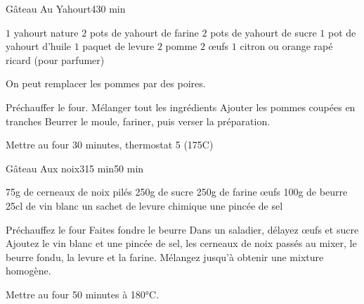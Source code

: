 \begin{recette}{Gâteau Au Yahourt}{4}{}{30 min}

\begin{ingredients}
\ingredient $1$ yahourt nature
\ingredient $2$ pots de yahourt de farine
\ingredient $2$ pots de yahourt de sucre
\ingredient $1$ pot de yahourt d'huile
\ingredient $1$ paquet de levure
\ingredient $2$ pomme
\ingredient $2$ œufs
\ingredient $1$ citron ou orange rapé
\ingredient ricard (pour parfumer)
\end{ingredients}

\begin{remarque}
On peut remplacer les pommes par des poires.
\end{remarque}

\begin{preparation}
\etape Préchauffer le four.
\etape Mélanger tout les ingrédients
\etape Ajouter les pommes coupées en tranches
\etape Beurrer le moule, fariner, puis verser la préparation.
\end{preparation}

\begin{cuisson}
Mettre au four 30 minutes, thermostat 5 (175\degres C)
\end{cuisson}
\end{recette}

\begin{recette}{Gâteau Aux noix}{3}{15 min}{50 min}

\begin{ingredients}
\ingredient 75g de cerneaux de noix pilés
\ingredient 250g de sucre
\ingredient 250g de farine
 œufs
\ingredient 100g de beurre
\ingredient 25cl de vin blanc
\ingredient un sachet de levure chimique
\ingredient une pincée de sel
\end{ingredients}

\begin{preparation}
\etape Préchauffez le four
\etape Faites fondre le beurre
\etape Dans un saladier, délayez œufs et sucre
\etape Ajoutez le vin blanc et une pincée de sel, les cerneaux de noix passés au mixer, le beurre fondu, la levure et la farine. 
\etape Mélangez jusqu'à obtenir une mixture homogène. 
\end{preparation}

\begin{cuisson}
Mettre au four 50 minutes à 180°C.
\end{cuisson}
\end{recette}

